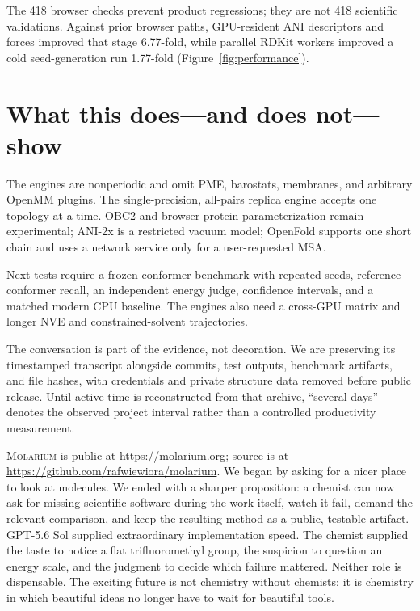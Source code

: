 \documentclass[10pt]{article}
\newcommand{\molarium}{\textsc{Molarium}}
\begin{document}
The 418 browser checks prevent product regressions; they are not 418 scientific
validations. Against prior browser paths, GPU-resident ANI descriptors and
forces improved that stage 6.77-fold, while parallel RDKit workers improved a
cold seed-generation run 1.77-fold (Figure~\ref{fig:performance}).

\section{What this does---and does not---show}

The engines are nonperiodic and omit PME, barostats, membranes, and arbitrary
OpenMM plugins. The single-precision, all-pairs replica engine accepts one
topology at a time. OBC2 and browser protein parameterization remain
experimental; ANI-2x is a restricted vacuum model; OpenFold supports one short
chain and uses a network service only for a user-requested MSA.

Next tests require a frozen conformer benchmark with repeated seeds,
reference-conformer recall, an independent energy judge, confidence intervals,
and a matched modern CPU baseline. The engines also need a cross-GPU matrix and
longer NVE and constrained-solvent trajectories.

The conversation is part of the evidence, not decoration. We are preserving its
timestamped transcript alongside commits, test outputs, benchmark artifacts,
and file hashes, with credentials and private structure data removed before
public release. Until active time is reconstructed from that archive, ``several
days'' denotes the observed project interval rather than a controlled
productivity measurement.

\molarium{} is public at \url{https://molarium.org}; source is at
\url{https://github.com/rafwiewiora/molarium}. We began by asking for a nicer
place to look at molecules. We ended with a sharper proposition: a chemist can
now ask for missing scientific software during the work itself, watch it fail,
demand the relevant comparison, and keep the resulting method as a public,
testable artifact. GPT-5.6 Sol supplied extraordinary implementation speed. The
chemist supplied the taste to notice a flat trifluoromethyl group, the suspicion to question an
energy scale, and the judgment to decide which failure mattered. Neither role is
dispensable. The exciting future is not chemistry without chemists; it is
chemistry in which beautiful ideas no longer have to wait for beautiful tools.
\end{document}
